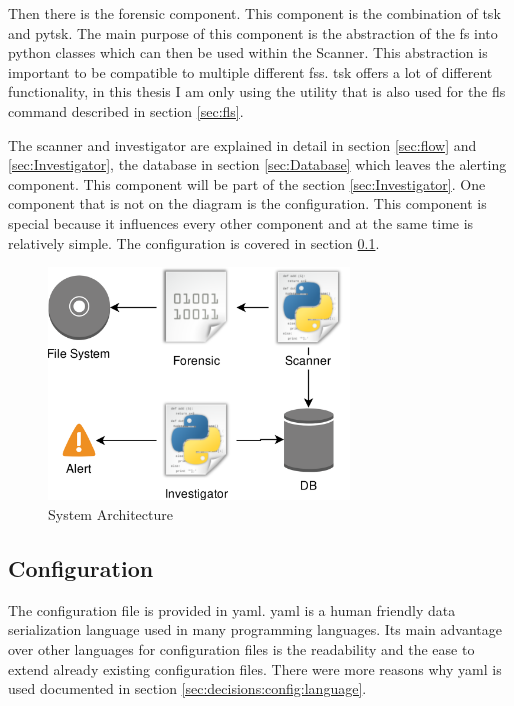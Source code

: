 \documentclass[
	a4paper,					%
	10pt,							%
	twoside,					%
	openright,				%
	notitlepage,			%
	parskip=half,			%
]{scrreprt}					%
\begin{document}
Then there is the forensic component. This component is the combination of \gls{tsk} and \gls{pytsk}. The main purpose of this component is the abstraction of the \gls{fs} into python classes which can then be used within the Scanner. This abstraction is important to be compatible to multiple different \glspl{fs}. \gls{tsk} offers a lot of different functionality, in this thesis I am only using the utility that is also used for the fls command described in section \ref{sec:fls}. 

The scanner and investigator are explained in detail in section \ref{sec:flow} and \ref{sec:Investigator}, the database in section \ref{sec:Database} which leaves the alerting component. This component will be part of the section \ref{sec:Investigator}. One component that is not on the diagram is the configuration. This component is special because it influences every other component and at the same time is relatively simple. The configuration is covered in section \ref{sec:Configuration}.

\begin{figure}[ht]
  \includegraphics[width=8cm]{../img/Overview_FIDS.png}
  \centering
  \caption{System Architecture}
  \label{fig:systemArchitecture}
\end{figure}

\subsection{Configuration}
\label{sec:Configuration}

The configuration file is provided in \gls{yaml}. \gls{yaml} is a human friendly data serialization language used in many programming languages. Its main advantage over other languages for configuration files is the readability and the ease to extend already existing configuration files. There were more reasons why \gls{yaml} is used documented in section \ref{sec:decisions:config:language}.
\end{document}
